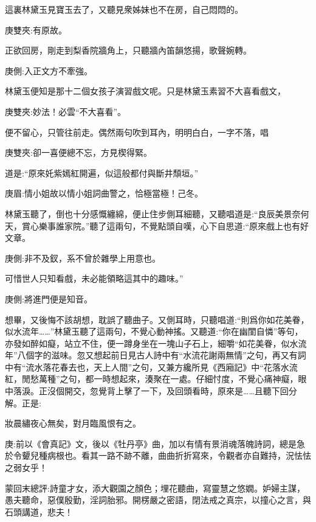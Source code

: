 \begin{parag}
    這裏林黛玉見寶玉去了，又聽見衆姊妹也不在房，自己悶悶的。\begin{note}庚雙夾:有原故。\end{note}正欲回房，剛走到梨香院牆角上，只聽牆內笛韻悠揚，歌聲婉轉。\begin{note}庚側:入正文方不牽強。\end{note}林黛玉便知是那十二個女孩子演習戲文呢。只是林黛玉素習不大喜看戲文，\begin{note}庚雙夾:妙法！必雲“不大喜看”。\end{note}便不留心，只管往前走。偶然兩句吹到耳內，明明白白，一字不落，唱\begin{note}庚雙夾:卻一喜便總不忘，方見楔得緊。\end{note}道是:“原來奼紫嫣紅開遍，似這般都付與斷井頹垣。”\begin{note}庚眉:情小姐故以情小姐詞曲警之，恰極當極！己冬。\end{note}林黛玉聽了，倒也十分感慨纏綿，便止住步側耳細聽，又聽唱道是:“良辰美景奈何天，賞心樂事誰家院。”聽了這兩句，不覺點頭自嘆，心下自思道:“原來戲上也有好文章。\begin{note}庚側:非不及釵，系不曾於雜學上用意也。\end{note}可惜世人只知看戲，未必能領略這其中的趣味。”\begin{note}庚側:將進門便是知音。\end{note}想畢，又後悔不該胡想，耽誤了聽曲子。又側耳時，只聽唱道:“則爲你如花美眷，似水流年……”林黛玉聽了這兩句，不覺心動神搖。又聽道:“你在幽閨自憐”等句，亦發如醉如癡，站立不住，便一蹲身坐在一塊山子石上，細嚼“如花美眷，似水流年”八個字的滋味。忽又想起前日見古人詩中有“水流花謝兩無情”之句，再又有詞中有“流水落花春去也，天上人間”之句，又兼方纔所見《西廂記》中“花落水流紅，閒愁萬種”之句，都一時想起來，湊聚在一處。仔細忖度，不覺心痛神癡，眼中落淚。正沒個開交，忽覺背上擊了一下，及回頭看時，原來是……且聽下回分解。正是:
\end{parag}


\begin{poem}
    \begin{pl}妝晨繡夜心無矣，對月臨風恨有之。\end{pl}
\end{poem}


\begin{parag}
    \begin{note}庚:前以《會真記》文，後以《牡丹亭》曲，加以有情有景消魂落魄詩詞，總是急於令顰兒種病根也。看其一路不跡不離，曲曲折折寫來，令觀者亦自難持，況怯怯之弱女乎！\end{note}
\end{parag}


\begin{parag}
    \begin{note}蒙回末總評:詩童才女，添大觀園之顏色；埋花聽曲，寫靈慧之悠嫺。妒婦主謀，愚夫聽命，惡僕殷勤，淫詞胎邪。開楞嚴之密語，閉法戒之真宗，以撞心之言，與石頭講道，悲夫！\end{note}
\end{parag}